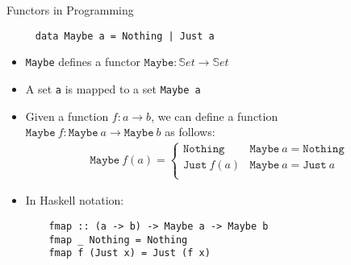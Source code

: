 \begin{frame}[fragile]{Functors in Programming}
 \begin{verbatim}
     data Maybe a = Nothing | Just a
 \end{verbatim}
 \begin{itemize}
  \item \texttt{Maybe} defines a functor $\texttt{Maybe} : \mathbb{S}et \to \mathbb{S}et$
  \item A set \texttt{a} is mapped to a set \texttt{Maybe a}
  \item Given a function $f : a \to b$, we can define a function $\texttt{Maybe}\ f : \texttt{Maybe}\ a \to \texttt{Maybe}\ b$  as follows:
  \begin{align*}
   \texttt{Maybe}\ f(a) = \begin{cases}
                           \texttt{Nothing} & \texttt{Maybe}\ a  = \texttt{Nothing}\\
                           \texttt{Just}\ f(a) & \texttt{Maybe}\ a  = \texttt{Just}\ a\\
                          \end{cases}
  \end{align*}
  \item In Haskell notation:
  \begin{verbatim}
    fmap :: (a -> b) -> Maybe a -> Maybe b
    fmap _ Nothing = Nothing
    fmap f (Just x) = Just (f x)
  \end{verbatim}

 \end{itemize}
\end{frame}